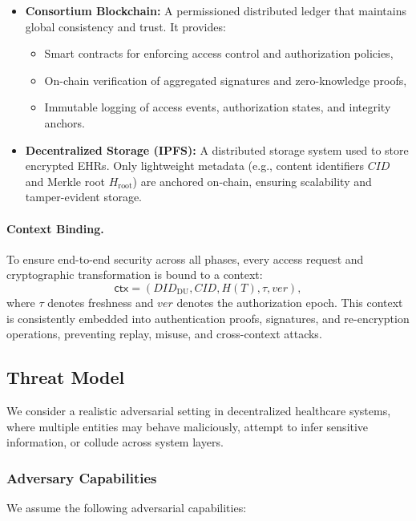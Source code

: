\documentclass[conference]{IEEEtran}
\begin{document}
\begin{itemize}
\item \textbf{Consortium Blockchain:}  
A permissioned distributed ledger that maintains global consistency and trust. It provides:
\begin{itemize}
    \item Smart contracts for enforcing access control and authorization policies,
    \item On-chain verification of aggregated signatures and zero-knowledge proofs,
    \item Immutable logging of access events, authorization states, and integrity anchors.
\end{itemize}

\item \textbf{Decentralized Storage (IPFS):}  
A distributed storage system used to store encrypted EHRs. Only lightweight metadata (e.g., content identifiers $CID$ and Merkle root $H_{\text{root}}$) are anchored on-chain, ensuring scalability and tamper-evident storage.

\end{itemize}

\paragraph{Context Binding.}
To ensure end-to-end security across all phases, every access request and cryptographic transformation is bound to a context:
\[
\mathsf{ctx} = (DID_{\text{DU}}, CID, H(T), \tau, ver),
\]
where $\tau$ denotes freshness and $ver$ denotes the authorization epoch. This context is consistently embedded into authentication proofs, signatures, and re-encryption operations, preventing replay, misuse, and cross-context attacks.


\subsection{Threat Model}

We consider a realistic adversarial setting in decentralized healthcare systems, where multiple entities may behave maliciously, attempt to infer sensitive information, or collude across system layers.

\subsubsection{Adversary Capabilities}

We assume the following adversarial capabilities:
\end{document}
